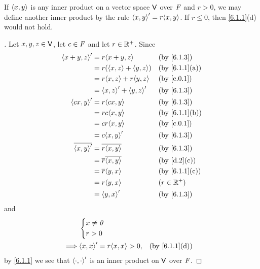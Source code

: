 \begin{eg}\label{6.1.3}
  If \(\left\langle x, y\right\rangle\) is any inner product on a vector space \(\mathsf{V}\) over \(\mathit{F}\) and \(r > 0\), we may define another inner product by the rule \(\inn{x, y}' = r \inn{x, y}\).
  If \(r \leq 0\), then \cref{6.1.1}(d) would not hold.
\end{eg}

\begin{proof}[]
  Let \(x, y, z \in \mathsf{V}\), let \(c \in \mathit{F}\) and let \(r \in \mathbb{R}^+\).
  Since
  \begin{align*}
    \inn{x + y, z}'    & = r\inn{x + y, z}             &  & \text{(by \cref{6.1.3})}    \\
                       & = r (\inn{x, z} + \inn{y, z}) &  & \text{(by \cref{6.1.1}(a))} \\
                       & = r \inn{x, z} + r \inn{y, z} &  & \text{(by \cref{c.0.1})}    \\
                       & = \inn{x, z}' + \inn{y, z}'   &  & \text{(by \cref{6.1.3})}    \\
    \inn{cx, y}'       & = r \inn{cx, y}               &  & \text{(by \cref{6.1.3})}    \\
                       & = rc \inn{x, y}               &  & \text{(by \cref{6.1.1}(b))} \\
                       & = cr \inn{x, y}               &  & \text{(by \cref{c.0.1})}    \\
                       & = c \inn{x, y}'               &  & \text{(by \cref{6.1.3})}    \\
    \conj{\inn{x, y}'} & = \conj{r \inn{x, y}}         &  & \text{(by \cref{6.1.3})}    \\
                       & = \conj{r} \conj{\inn{x, y}}  &  & \text{(by \cref{d.2}(c))}   \\
                       & = \conj{r} \inn{y, x}         &  & \text{(by \cref{6.1.1}(c))} \\
                       & = r \inn{y, x}                &  & (r \in \R^+)                \\
                       & = \inn{y, x}'                 &  & \text{(by \cref{6.1.3})}
  \end{align*}
  and
  \begin{align*}
             & \begin{dcases}
                 x \neq \zv \\
                 r > 0
               \end{dcases}                                                    \\
    \implies & \inn{x, x}' = r \inn{x, x} > 0, &  & \text{(by \cref{6.1.1}(d))}
  \end{align*}
  by \cref{6.1.1} we see that \(\left\langle\cdot, \cdot\right\rangle'\) is an inner product on \(\mathsf{V}\) over \(\mathit{F}\).
\end{proof}

